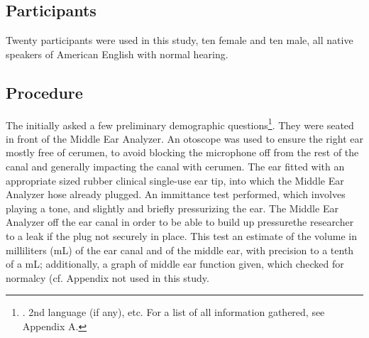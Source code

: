 \subsection{Participants}
Twenty participants were used in this study, ten female and ten male, all native speakers of American English with normal hearing.

\subsection{Procedure}\DIFaddbegin \label{chap2:methods:procedure}
\DIFaddend 

The \DIFdelbegin {}\DIFdelend \DIFaddbegin {}\DIFaddend initially asked a few preliminary demographic questions\footnote{\DIFdelbegin {}\DIFdelend \DIFaddbegin {}\DIFaddend . 2nd language (if any), etc. For a list of all information gathered, see Appendix A\DIFdelbegin \DIFdel{\ref{appendixB}}\DIFdelend \DIFaddbegin \DIFadd{\ref{appendixA}}\DIFaddend .}. They were seated in front of the Middle Ear Analyzer.  An otoscope was used to ensure the right ear \DIFdelbegin {}\DIFdelend \DIFaddbegin {}\DIFaddend mostly free of cerumen, to avoid blocking the microphone off from the rest of the canal and generally impacting the canal with cerumen.  The ear \DIFdelbegin {}\DIFdelend \DIFaddbegin {}\DIFaddend fitted with an appropriate sized rubber clinical single-use ear tip, into which the Middle Ear Analyzer hose \DIFdelbegin {}\DIFdelend \DIFaddbegin {}\DIFaddend already plugged.  An immittance test \DIFdelbegin {}\DIFdelend \DIFaddbegin {}\DIFaddend performed, which involves playing a tone, and slightly and briefly pressurizing the ear.  The Middle Ear Analyzer \DIFdelbegin {}\DIFdelend \DIFaddbegin {}\DIFaddend off the ear canal in order to be able to build up pressure\DIFdelbegin {}\DIFdelend \DIFaddbegin {}\DIFaddend the researcher to a leak if the plug \DIFdelbegin {}\DIFdelend \DIFaddbegin {}\DIFaddend not securely in place.  This test \DIFdelbegin {}\DIFdelend \DIFaddbegin {}\DIFaddend an estimate of the volume in milliliters (mL) of the ear canal and of the middle ear, with precision to a tenth of a mL; additionally, a graph of middle ear function \DIFdelbegin {}\DIFdelend \DIFaddbegin {}\DIFaddend given, which \DIFdelbegin {}\DIFdelend \DIFaddbegin {}\DIFaddend checked for normalcy (cf. Appendix \DIFdelbegin {}\DIFdelend \DIFaddbegin {}\DIFaddend not used in this study.

